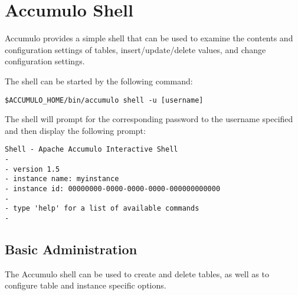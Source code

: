 
%
%

\chapter{Accumulo Shell} 
Accumulo provides a simple shell that can be used to examine the contents and
configuration settings of tables, insert/update/delete values, and change
configuration settings. 

The shell can be started by the following command:

\begingroup\fontsize{8pt}{8pt}\selectfont\begin{verbatim}
$ACCUMULO_HOME/bin/accumulo shell -u [username]
\end{verbatim}\endgroup

The shell will prompt for the corresponding password to the username specified
and then display the following prompt:

\begingroup\fontsize{8pt}{8pt}\selectfont\begin{verbatim}
Shell - Apache Accumulo Interactive Shell
-
- version 1.5
- instance name: myinstance
- instance id: 00000000-0000-0000-0000-000000000000
-
- type 'help' for a list of available commands
-
\end{verbatim}\endgroup

\section{Basic Administration}

The Accumulo shell can be used to create and delete tables, as well as to configure
table and instance specific options.

